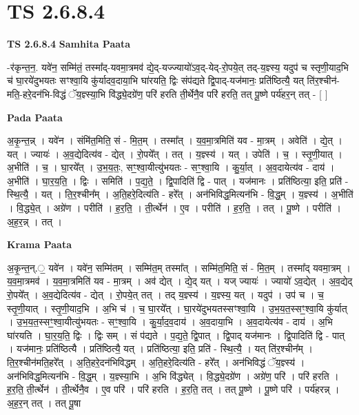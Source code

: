 \documentclass[17pt]{extarticle}
\begin{document}
\section*{ TS 2.6.8.4 }

\textbf{TS 2.6.8.4 } \newline
\textbf{Samhita Paata} \newline

-र॑कृन्त॒न॒. यवे॑न॒ सम्मि॑तं॒ तस्मा᳚द्-यवमा॒त्रमव॑ द्ये॒द्-यज्ज्यायो॑ऽव॒द्-येद्-रो॒पये॒त् तद्-य॒ज्ञ्स्य॒ यदुप॑ च स्तृणी॒याद॒भि च॑ घा॒रये॑दुभयतः सꣳश्वा॒यि कु॑र्यादव॒दाया॒भि घा॑रयति॒ द्विः संप॑द्यते द्वि॒पाद्-यज॑मानः॒ प्रति॑ष्ठित्यै॒ यत् ति॑र॒श्चीन॑-मति॒-हरे॒दन॑भि-विद्धं ॅय॒ज्ञ्स्या॒भि वि॑द्ध्ये॒दग्रे॑ण॒ परि॑ हरति ती॒र्थेनै॒व परि॑ हरति॒ तत् पू॒ष्णे पर्य॑हर॒न् तत् - [  ] \newline

\textbf{Pada Paata} \newline

अ॒कृ॒न्त॒न्न् । यवे॑न । संमि॑त॒मिति॒ सं - मि॒त॒म् । तस्मा᳚त् । य॒व॒मा॒त्रमिति॑ यव - मा॒त्रम् । अवेति॑ । द्ये॒त् । यत् । ज्यायः॑ । अ॒व॒द्येदित्य॑व - द्येत् । रो॒पये᳚त् । तत् । य॒ज्ञ्स्य॑ । यत् । उपेति॑ । च॒ । स्तृ॒णी॒यात् । अ॒भीति॑ । च॒ । घा॒रये᳚त् । उ॒भ॒य॒तः॒, सꣳ॒॒श्वा॒यीत्यु॑भयतः - सꣳ॒॒श्वा॒यि । कु॒र्या॒त् । अ॒व॒दायेत्य॑व - दाय॑ । अ॒भीति॑ । घा॒र॒य॒ति॒ । द्विः । समिति॑ । प॒द्य॒ते॒ । द्वि॒पादिति॑ द्वि - पात् । यज॑मानः । प्रति॑ष्ठित्या॒ इति॒ प्रति॑ - स्थि॒त्यै॒ । यत् । ति॒र॒श्चीन᳚म् । अ॒ति॒हरे॒दित्य॑ति - हरे᳚त् । अन॑भिविद्ध॒मित्यन॑भि - वि॒द्ध॒म् । य॒ज्ञ्स्य॑ । अ॒भीति॑ । वि॒द्ध्ये॒त् । अग्रे॑ण । परीति॑ । ह॒र॒ति॒ । ती॒र्त्थेन॑ । ए॒व । परीति॑ । ह॒र॒ति॒ । तत् । पू॒ष्णे । परीति॑ । अ॒ह॒र॒न्न् । तत् ।  \newline


\textbf{Krama Paata} \newline

अ॒कृ॒न्त॒न्.॒ यवे॑न । यवे॑न॒ सम्मि॑तम् । सम्मि॑त॒म् तस्मा᳚त् । सम्मि॑त॒मिति॒ सं - मि॒त॒म् । तस्मा᳚द् यवमा॒त्रम् । य॒व॒मा॒त्रमव॑ । य॒व॒मा॒त्रमिति॑ यव - मा॒त्रम् । अव॑ द्येत् । द्ये॒द् यत् । यज् ज्यायः॑ । ज्यायो॑ ऽव॒द्येत् । अ॒व॒द्येद् रो॒पये᳚त् । अ॒व॒द्येदित्य॑व - द्येत् । रो॒पये॒त् तत् । तद् य॒ज्ञ्स्य॑ । य॒ज्ञ्स्य॒ यत् । यदुप॑ । उप॑ च । च॒ स्तृ॒णी॒यात् । स्तृ॒णी॒याद॒भि । अ॒भि च॑ । च॒ घा॒रये᳚त् । घा॒रये॑दुभयतस्सꣳश्वा॒यि । उ॒भ॒य॒त॒स्सꣳ॒॒श्वा॒यि कु॑र्यात् । उ॒भ॒य॒त॒स्सꣳ॒॒श्वा॒यीत्यु॑भयतः - सꣳ॒॒श्वा॒यि । कु॒र्या॒द॒व॒दाय॑ । अ॒व॒दाया॒भि । अ॒व॒दायेत्य॑व - दाय॑ । अ॒भि घा॑रयति । घा॒र॒य॒ति॒ द्विः । द्विः सम् । सं प॑द्यते । प॒द्य॒ते॒ द्वि॒पात् । द्वि॒पाद् यज॑मानः । द्वि॒पादिति॑ द्वि - पात् । यज॑मानः॒ प्रति॑ष्ठित्यै । प्रति॑ष्ठित्यै॒ यत् । प्रति॑ष्ठित्या॒ इति॒ प्रति॑ - स्थि॒त्यै॒ । यत् ति॑र॒श्चीन᳚म् । ति॒र॒श्चीन॑मति॒हरे᳚त् । अ॒ति॒हरे॒दन॑भिविद्धम् । अ॒ति॒हरे॒दित्य॑ति - हरे᳚त् । अन॑भिविद्धं ॅय॒ज्ञ्स्य॑ । अन॑भिविद्ध॒मित्यन॑भि - वि॒द्ध॒म् । य॒ज्ञ्स्या॒भि । अ॒भि वि॑द्ध्येत् । वि॒द्ध्ये॒दग्रे॑ण । अग्रे॑ण॒ परि॑ । परि॑ हरति । ह॒र॒ति॒ ती॒र्त्थेन॑ । ती॒र्त्थेनै॒व । ए॒व परि॑ । परि॑ हरति । ह॒र॒ति॒ तत् । तत् पू॒ष्णे । पू॒ष्णे परि॑ । पर्य॑हरन्न् । अ॒ह॒र॒न् तत् । तत् पू॒षा \newline
\end{document}
